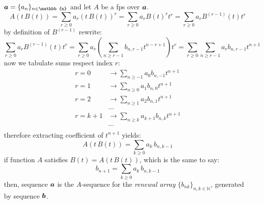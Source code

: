 $\vect{a}=\lbrace a_{n} \rbrace_{n\in\mathbb{n}}$ and let $A$ be
a \ac{fps} over $\boldsymbol{a}$.
\begin{displaymath}
    A\left(t\,B(t)\right) 
        = \sum_{r\geq 0}{a_{r}\left(t\,B(t)\right)^{r}}
        = \sum_{r\geq 0}{a_{r}B(t)^{r}t^{r}}
        = \sum_{r\geq 0}{a_{r}B^{(r-1)}(t)t^{r}}
\end{displaymath}
by definition of $B^{(r-1)}$ rewrite:
\begin{displaymath}
    \sum_{r\geq 0}{a_{r}B^{(r-1)}(t)t^{r}}
        =\sum_{r\geq 0}{a_{r}\left(\sum_{n\geq r-1}{b_{n,r-1}t^{n-r+1}}\right)t^{r}}
        =\sum_{r\geq 0}{\sum_{n\geq r-1}{a_{r}b_{n,r-1}t^{n+1}}}
\end{displaymath}
now we tabulate sums respect index $r$:
\begin{displaymath}
    \begin{split}
        r=0 &\rightarrow \sum_{n\geq -1}{a_{0}b_{n,-1}t^{n+1}}\\
        r=1 &\rightarrow \sum_{n\geq 0}{a_{1}b_{n,0}t^{n+1}}\\
        r=2 &\rightarrow \sum_{n\geq 1}{a_{2}b_{n,1}t^{n+1}}\\
        &\ldots\\
        r=k+1 &\rightarrow \sum_{n\geq k}{a_{k+1}b_{n,k}t^{n+1}}\\
        &\ldots\\
    \end{split}
\end{displaymath}
therefore extracting coefficient of $t^{n+1}$ yields:
\begin{displaymath}
    [t^{n+1}]A(t\,B(t))=\sum_{k\geq 0}{a_{k}\,b_{n,k-1}}
\end{displaymath}
if function $A$ satisfies $B(t)=A(t\,B(t))$, which is the same to say:
\begin{displaymath}
    b_{n+1}=\sum_{k\geq 0}{a_{k}\,b_{n,k-1}}
\end{displaymath}
then, sequence $\boldsymbol{a}$ 
is the $A$-sequence for the \emph{renewal array}
$\lbrace b_{nk}\rbrace_{n,k\in\mathbb{N}}$, generated by
sequence $\boldsymbol{b}$.

